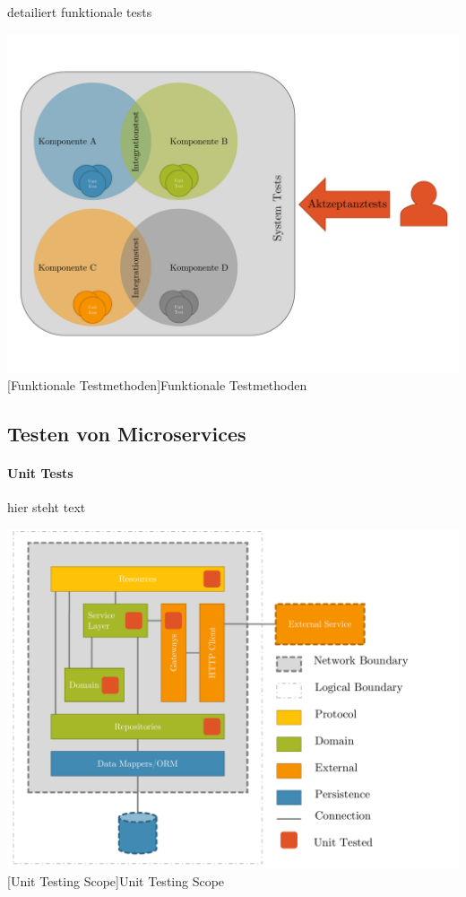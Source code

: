 \documentclass[12pt,a4paper,bibliography=totocnumbered,listof=totocnumbered]{scrartcl}
\begin{document}
detailiert funktionale tests

\vspace{1em}
\begin{minipage}{\linewidth}
	\centering
	\includegraphics[width=0.9\linewidth]{images/img_testmethods_functional.pdf}
	[Funktionale Testmethoden]{Funktionale Testmethoden}
	\label{fig:img_testmethods_functional}
\end{minipage}

\subsection{Testen von Microservices}

\paragraph{Unit Tests}

hier steht text

\vspace{1em}
\begin{minipage}{\linewidth}
	\centering
	\includegraphics[width=0.9\linewidth]{images/img_unit-testing.pdf}
	[Unit Testing Scope]{Unit Testing Scope \cite{clemson}}
	\label{fig:img_unit-testing}
\end{minipage}
\end{document}
